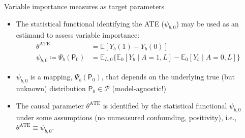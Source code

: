 \documentclass{beamer}
\begin{document}
\begin{frame}[c]{Variable importance measures as target parameters}

\begin{center}
\begin{itemize}
  \itemsep6pt
  \item The statistical functional identifying the ATE ($\psi_{b,0}$) may be
    used as an estimand to assess variable importance:
    \begin{align*}
      \theta^{\text{ATE}} &= \mathbb{E}[Y_b(1) - Y_b(0)] \\
      \psi_{b,0} \coloneqq \Psi_b(\mathsf{P}_0) &=
        \mathbb{E}_{L,0}\{\mathbb{E}_0[Y_b \mid A = 1, L] -
        \mathbb{E}_0[Y_b \mid A = 0, L]\}
    \end{align*}
  \item $\psi_{b,0}$ is a mapping, $\Psi_b(\mathsf{P}_0)$, that depends on the
    underlying true (but unknown) distribution $\mathsf{P}_0 \in \mathcal{P}$
    (model-agnostic!)
  \item The causal parameter $\theta^{\text{ATE}}$ is identified by the
    statistical functional $\psi_{b,0}$ under some assumptions (no unmeasured
    confounding, positivity), i.e., $\theta^{\text{ATE}} \equiv \psi_{b,0}$.
\end{itemize}
\end{center}

\end{frame}

\end{document}
